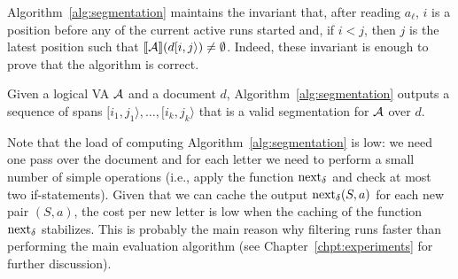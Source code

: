 Algorithm~\ref{alg:segmentation} maintains the invariant that, after reading $a_\ell$, $i$ is a position before any of the current active runs started and, if $i < j$,  then $j$ is the latest position such that $\llbracket\mathcal{A}\rrbracket(d[i, j\rangle) \neq \emptyset$. Indeed, these invariant is enough to prove that the algorithm is correct.
\begin{theorem}\label{theo:segmentation}
	Given a logical VA $\mathcal{A}$ and a document $d$, Algorithm~\ref{alg:segmentation} outputs a sequence of spans $[i_1, j_1\rangle, \ldots, [i_k, j_k\rangle$ that is a valid segmentation for $\mathcal{A}$ over $d$.
\end{theorem}

Note that the load of computing Algorithm~\ref{alg:segmentation} is low: we need one pass over the document and for each letter we need to perform a small number of simple operations (i.e., apply the function $\operatorname{next}_{\delta}$ and check at most two if-statements). Given that we can cache the output $\operatorname{next}_{\delta}(S, a)$ for each new pair $(S, a)$, the cost per new letter is low when the caching of the function $\operatorname{next}_{\delta}$ stabilizes. This is probably the main reason why filtering runs faster   than performing the main evaluation algorithm (see Chapter~\ref{chpt:experiments} for further discussion).


